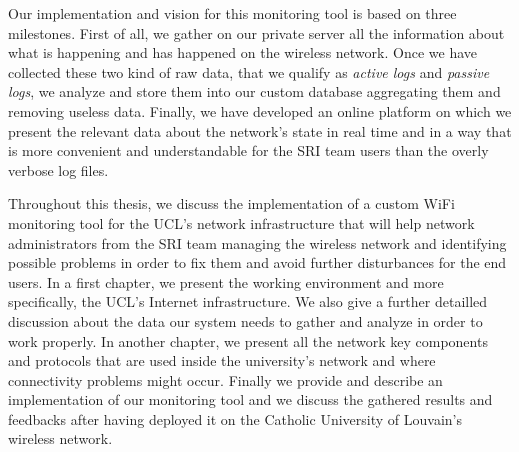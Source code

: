 
Our implementation and vision for this monitoring tool is based on three milestones. First of all, we gather on our private server all the information about what is happening and has happened on the wireless network. Once we have collected these two kind of raw data, that we qualify as \textit{active logs} and \textit{passive logs}, we analyze and store them into our custom database aggregating them and removing useless data. Finally, we have developed an online platform on which we present the relevant data about the network's state in real time and in a way that is more convenient and understandable for the SRI team users than the overly verbose log files.

Throughout this thesis, we discuss the implementation of a custom WiFi monitoring tool for the UCL's network infrastructure that will help network administrators from the SRI team managing the wireless network and identifying possible problems in order to fix them and avoid further disturbances for the end users. In a first chapter, we present the working environment and more specifically, the UCL's Internet infrastructure. We also give a further detailled discussion about the data our system needs to gather and analyze in order to work properly. In another chapter, we present all the network key components and protocols that are used inside the university's network and where connectivity problems might occur. Finally we provide and describe an implementation of our monitoring tool and we discuss the gathered results and feedbacks after having deployed it on the Catholic University of Louvain's wireless network.

